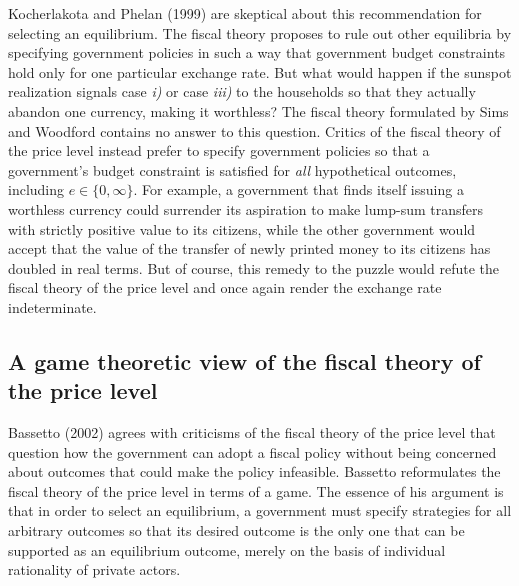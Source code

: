  Kocherlakota and Phelan (1999) are
 skeptical about this recommendation for selecting an equilibrium.
The fiscal theory proposes to rule out other  equilibria by
specifying government policies in such a way that government
budget constraints
 hold only for  one particular exchange rate. But what would happen
if the sunspot realization signals case {\it i)} or case {\it
iii)} to the households so that they actually abandon one
currency, making it worthless? The fiscal theory formulated by
Sims and Woodford contains no answer to this
question.
 Critics of the fiscal
theory of the price level instead prefer  to specify government
policies so that a government's budget constraint is satisfied for
{\it all\/} hypothetical outcomes, including $e\in\{0,\infty\}$.
For example, a government that finds itself issuing a worthless
currency could surrender its aspiration to make lump-sum transfers
with strictly positive value
 to its citizens, while  the other government
 would accept that the value of the  transfer of newly printed money to its citizens
has doubled in real terms. But of course, this remedy to the
puzzle would refute the fiscal theory of the price level and once
again render the  exchange rate indeterminate.   %



\subsection{A game theoretic view of the fiscal theory of the price level}\label{sec:BassettoFTPL}%
%
Bassetto (2002) agrees with criticisms of the fiscal theory of
the price level that question how the government can adopt a fiscal
policy  without being concerned about
outcomes that could make the policy infeasible. Bassetto  reformulates
the fiscal theory of the price level in terms of a game. The essence of his argument
is that in order to select an equilibrium, a government must specify
strategies for all arbitrary outcomes so that its desired outcome is the
only one that can be supported as an equilibrium outcome, merely on the
basis of individual rationality of private actors.


